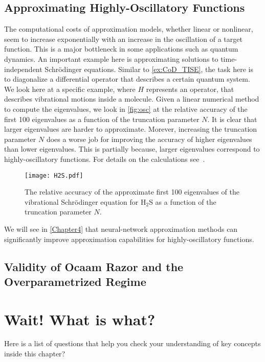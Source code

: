 \subsection{Approximating Highly-Oscillatory Functions}
The computational costs of approximation models, whether linear or nonlinear,
seem to increase exponentially with an increase in the oscillation of a target
function. This is a major bottleneck in some applications such as quantum
dynamics. An important example here is approximating solutions to
time-independent Schrödinger equations. Similar to \autoref{ex:CoD_TISE}, the
task here is to diagonalize a differential operator that describes a certain
quantum system. We look here at a specific example, where $H$ represents an
operator, that describes vibrational motions inside a molecule. Given a linear
numerical method to compute the eigenvalues, we look in \autoref{fig:osc} at the
relative accuracy of the
first 100 eigenvalues as a function of the truncation parameter $N$. It is clear
that larger eigenvalues are harder to approximate. Morever, increasing the
truncation parameter $N$ does a worse job for improving the accuracy of higher
eigenvalues than lower eigenvalues. This is partially because, larger
eigenvalues correspond to highly-oscillatory functions. For details on the
calculations see~\cite{Saleh:arXiv2308}.

\begin{figure}[htbp]
    \centering
    \texttt{[image: H2S.pdf]}
    \caption{The relative accuracy of the approximate first 100 eigenvalues of the vibrational Schrödinger equation for H$_2$S as a function of the truncation parameter $N$.}
    \label{fig:osc}
\end{figure}   
We will see in \autoref{Chapter4} that neural-network approximation methods can
significantly improve approximation capabilities for highly-oscillatory functions.
\subsection{Validity of Ocaam Razor and the Overparametrized Regime}


\section*{Wait! What is what?}
Here is a list of questions that help you check your understanding of key
concepts inside this chapter?

